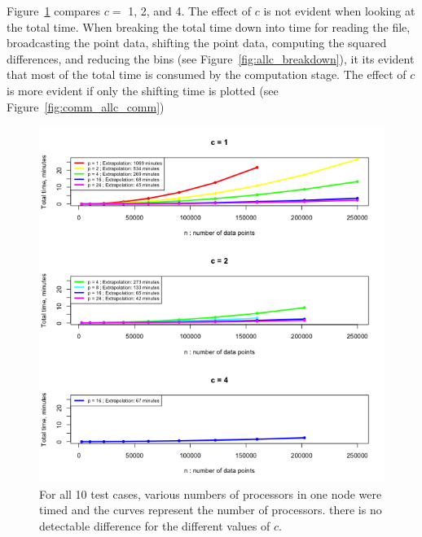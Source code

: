 Figure~\ref{fig:comm_allc_timings} compares $c=$ 1, 2, and 4. The effect of $c$ is not evident when looking at the total time. When breaking the total time down into time for reading the file, broadcasting the point data, shifting the point data, computing the squared differences, and reducing the bins (see Figure~\ref{fig:allc_breakdown}), it its evident that most of the total time is consumed by the computation stage. The effect of $c$ is more evident if only the shifting time is plotted (see Figure~\ref{fig:comm_allc_comm})

\begin{figure}[!h]
   \centering
   \includegraphics[width=\textwidth]{./fig/comm_allc_timings.png} %
   \caption{For all 10 test cases, various numbers of processors in one node were timed and the curves represent the number of processors. there is no detectable difference for the different values of $c$. }
   \label{fig:comm_allc_timings}
\end{figure}

